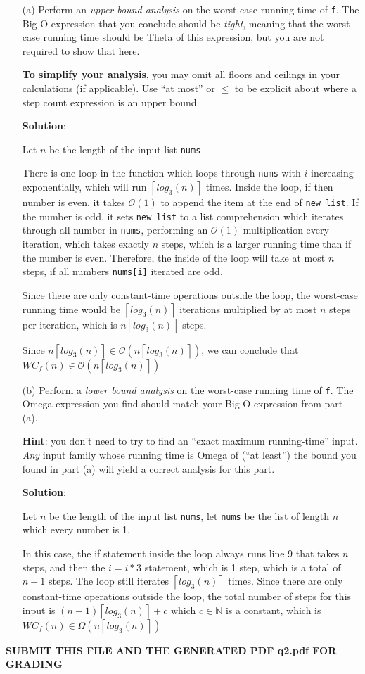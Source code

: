 \documentclass{article}
\newcommand{\N}{\mathbb{N}}
\newcommand{\cO}{\mathcal{O}}
\newcommand{\ceil}[1]{\left\lceil #1 \right\rceil}
\newcommand{\C}{\texttt}
\begin{document}
\begin{enumerate}

\item[(a)]
Perform an \emph{upper bound analysis} on the worst-case running time of \texttt{f}.
The Big-O expression that you conclude should be \emph{tight}, meaning that the worst-case running time should be Theta of this expression, but you are not required to show that here.

\textbf{To simplify your analysis}, you may omit all floors and ceilings in your calculations (if applicable).
Use ``at most'' or $\leq$ to be explicit about where a step count expression is an upper bound.

\textbf{Solution}:

Let $n$ be the length of the input list \C{nums}

There is one loop in the function which loops through \C{nums} with $i$ increasing exponentially, which will run $\ceil{log_3(n)}$ times. Inside the loop, if then number is even, it takes $\cO(1)$ to append the item at the end of \C{new\_list}. If the number is odd, it sets \C{new\_list} to a list comprehension which iterates through all number in \C{nums}, performing an $\cO(1)$ multiplication every iteration, which takes exactly $n$ steps, which is a larger running time than if the number is even. Therefore, the inside of the loop will take at most $n$ steps, if all numbers \C{nums[i]} iterated are odd.

Since there are only constant-time operations outside the loop, the worst-case running time would be $\ceil{log_3(n)}$ iterations multiplied by at most $n$ steps per iteration, which is $n\ceil{log_3(n)}$ steps. 

Since $n\ceil{log_3(n)} \in \cO(n\ceil{log_3(n)})$, we can conclude that $WC_{f}(n) \in \cO(n\ceil{log_3(n)})$

\item[(b)]
Perform a \emph{lower bound analysis} on the worst-case running time of \texttt{f}.
The Omega expression you find should match your Big-O expression from part (a).

\textbf{Hint}: you don't need to try to find an ``exact maximum running-time'' input. \emph{Any} input family whose running time is Omega of (``at least'') the bound you found in part (a) will yield a correct analysis for this part.

\textbf{Solution}:

Let $n$ be the length of the input list \C{nums}, let \C{nums} be the list of length $n$ which every number is 1.

In this case, the if statement inside the loop always runs line 9 that takes $n$ steps, and then the $i = i * 3$ statement, which is 1 step, which is a total of $n + 1$ steps. The loop still iterates $\ceil{log_3(n)}$ times. Since there are only constant-time operations outside the loop, the total number of steps for this input is $(n + 1)\ceil{log_3(n)} + c$ which $c \in \N$ is a constant, which is $WC_{f}(n) \in \Omega(n\ceil{log_3(n)})$

\end{enumerate}

\begin{center}
    \textbf{SUBMIT THIS FILE AND THE GENERATED PDF q2.pdf FOR GRADING}
\end{center}
\end{document}

